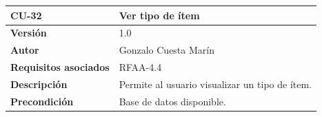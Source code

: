 \documentclass[
]{article}
\begin{document}
\begin{longtable}[]{@{}ll@{}}
\toprule
\begin{minipage}[b]{0.18\columnwidth}\raggedright
\textbf{CU-32}\strut
\end{minipage} & \begin{minipage}[b]{0.76\columnwidth}\raggedright
\textbf{Ver tipo de ítem}\strut
\end{minipage}\tabularnewline
\midrule
\endhead
\begin{minipage}[t]{0.18\columnwidth}\raggedright
\textbf{Versión}\strut
\end{minipage} & \begin{minipage}[t]{0.76\columnwidth}\raggedright
1.0\strut
\end{minipage}\tabularnewline
\begin{minipage}[t]{0.18\columnwidth}\raggedright
\textbf{Autor}\strut
\end{minipage} & \begin{minipage}[t]{0.76\columnwidth}\raggedright
Gonzalo Cuesta Marín\strut
\end{minipage}\tabularnewline
\begin{minipage}[t]{0.18\columnwidth}\raggedright
\textbf{Requisitos asociados}\strut
\end{minipage} & \begin{minipage}[t]{0.76\columnwidth}\raggedright
RFAA-4.4\strut
\end{minipage}\tabularnewline
\begin{minipage}[t]{0.18\columnwidth}\raggedright
\textbf{Descripción}\strut
\end{minipage} & \begin{minipage}[t]{0.76\columnwidth}\raggedright
Permite al usuario visualizar un tipo de ítem.\strut
\end{minipage}\tabularnewline
\begin{minipage}[t]{0.18\columnwidth}\raggedright
\textbf{Precondición}\strut
\end{minipage} & \begin{minipage}[t]{0.76\columnwidth}\raggedright
Base de datos disponible.


\end{minipage}
\end{longtable}
\end{document}
